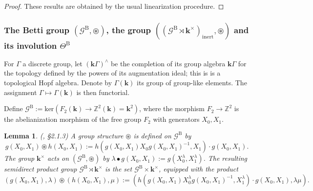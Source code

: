 \documentclass[10pt]{amsart}
\newtheorem{lem}[thm]{Lemma}
\numberwithin{equation}{subsection}
\begin{document}
\begin{proof} These results are obtained by the usual linearization procedure.  
\end{proof}

\subsubsection{The Betti group $(\mathcal G^{{\mathrm B}},\circledast)$, the group 
$((\mathcal G^{{\mathrm B}}\rtimes\mathbf k^\times)_{\mathrm{inert}},\circledast)$ 
and its involution $\Theta^{\mathrm B}$} 


For $\Gamma$ a discrete group, let $(\mathbf k\Gamma)^\wedge$ be 
the completion of its group algebra $\mathbf k\Gamma$ for the topology 
defined by the powers of its augmentation ideal; 
this is is a topological Hopf algebra. 
Denote by $\Gamma(\mathbf k)$ its group of group-like elements. The assignment 
$\Gamma\mapsto \Gamma(\mathbf k)$ is then functorial. 


\begin{defn}
    Define $\mathcal G^{\mathrm B}:=\mathrm{ker}(F_2(\mathbf k)\to\mathbb Z^2(\mathbf k)
    =\mathbf k^2)$, 
    where the morphism $F_2\to\mathbb Z^2$ is the abelianization morphism of the free group $F_2$ 
    with generators $X_0,X_1$.
\end{defn}

\begin{lem}\label{lem:mathcalG:betti} (\cite{EF3}, §2.1.3)
A group structure $\circledast$ is defined on $\mathcal G^{\mathrm B}$ by 
$$
g(X_0,X_1)\circledast h(X_0,X_1)
:=h(g(X_0,X_1)X_0 g(X_0,X_1)^{-1},X_1)  \cdot g(X_0,X_1).
$$
The group $\mathbf k^\times$ acts on $(\mathcal G^{\mathrm B},\circledast)$ by 
$\lambda\bullet g(X_0,X_1):=g(X_0^\lambda,X_1^\lambda)$. The resulting semidirect 
product group $\mathcal G^{\mathrm B}\rtimes \mathbf k^\times$ is the set 
$\mathcal G^{\mathrm B}\times \mathbf k^\times$, equipped with the product 
$$
(g(X_0,X_1),\lambda)\circledast (h(X_0,X_1),\mu)
:=(h(g(X_0,X_1)X_0^\lambda g(X_0,X_1)^{-1},X_1^\lambda)  \cdot g(X_0,X_1),\lambda\mu). 
$$
\end{lem}    
\end{document}
